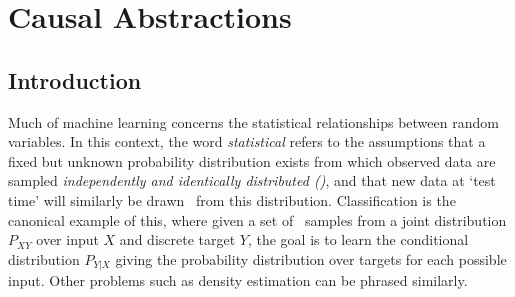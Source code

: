 \chapter{Causal Abstractions}\label{chapter:causality}

\ifpdf
    \graphicspath{{Chapter3/Figs/Raster/}{Chapter3/Figs/PDF/}{Chapter3/Figs/}}
\else
    \graphicspath{{Chapter3/Figs/Vector/}{Chapter3/Figs/}}
\fi

%
%
%
%
%
%
%
%
%



\section{Introduction}

Much of machine learning concerns the statistical relationships between random variables. In this context, the word \emph{statistical} refers to the assumptions that a fixed but unknown probability distribution exists from which observed data are sampled \emph{independently and identically distributed (\iid)}, and that new data at `test time' will similarly be drawn \iid~from this distribution.
Classification is the canonical example of this, where given a set of \iid~samples from a joint distribution $P_{XY}$ over input $X$ and discrete target $Y$, the goal is to learn the conditional distribution $P_{Y|X}$ giving the probability distribution over targets for each possible input. Other problems such as density estimation can be phrased similarly.

